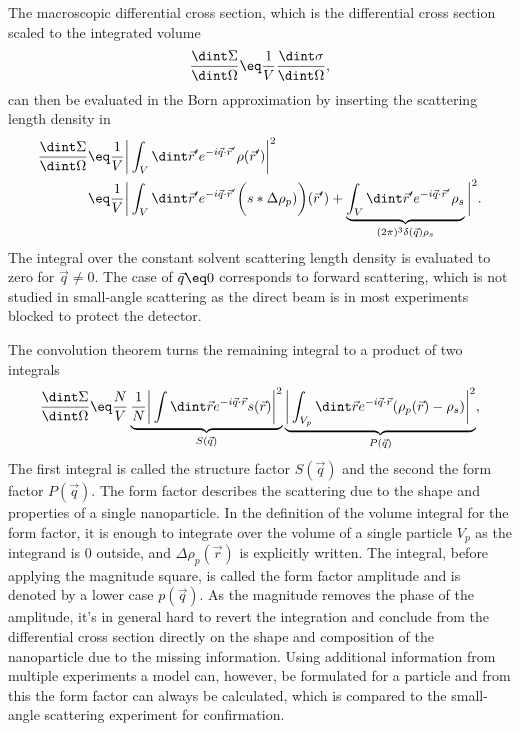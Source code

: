 \documentclass[\main/dresen_thesis.tex]{subfiles}
\begin{document}
    The macroscopic differential cross section, which is the differential cross section scaled to the integrated volume
    \begin{align}
      \frac{\dint \Sigma}{\dint \Omega} \eq \frac{1}{V} \frac{\dint \sigma}{\dint \Omega},
    \end{align}
    can then be evaluated in the Born approximation by inserting the scattering length density in 
    \begin{align}
      \begin{split}
        \frac{\dint \Sigma}{\dint \Omega}
        \eq& \frac{1}{V} \bigg| \int_V \dint \vec{r}^\prime e^{-i\vec{q} \cdot \vec{r}^\prime} \rho (\vec{r}^\prime) \bigg|^2 \\
        \eq& \frac{1}{V} \bigg| \int_{V} \dint \vec{r}^\prime e^{-i\vec{q} \cdot \vec{r}^\prime} \biggl( s * \Delta \rho_{p}) \biggr) (\vec{r}^\prime) + \underbrace{\int_{V} \dint \vec{r}^\prime e^{-i\vec{q} \cdot \vec{r}^\prime} \rho_s }_{(2 \pi)^3 \delta(\vec{q}) \rho_s} \bigg|^2.
      \end{split}
    \end{align}
    The integral over the constant solvent scattering length density is evaluated to zero for $\vec{q} \neq 0$.
    The case of $\vec{q} \eq 0$ corresponds to forward scattering, which is not studied in small-angle scattering as the direct beam is in most experiments blocked to protect the detector.

    The convolution theorem turns the remaining integral to a product of two integrals
    \begin{align}
      \frac{\dint \Sigma}{\dint \Omega}
      \eq \frac{N}{V} \underbrace{\frac{1}{N} \bigg|\int \dint \vec{r} e^{-i\vec{q} \cdot \vec{r}} s(\vec{r})\bigg|^2}_{S(\vec{q})}
      \underbrace{ \bigg|\int_{V_{p}} \dint \vec{r} e^{-i\vec{q} \cdot \vec{r}} (\rho_p (\vec{r}) - \rho_s) \bigg|^2}_{P(\vec{q})},\label{eq:theoreticalBackground:scattering:scatteringTheory:sasParticlesformStructureFactor}
    \end{align}
    The first integral is called the structure factor $S(\vec{q})$ and the second the form factor $P(\vec{q})$.
    The form factor describes the scattering due to the shape and properties of a single nanoparticle.
    In the definition of the volume integral for the form factor, it is enough to integrate over the volume of a single particle $V_p$ as the integrand is $0$ outside, and $\Delta \rho_p (\vec{r})$ is explicitly written.
    The integral, before applying the magnitude square, is called the form factor amplitude and is denoted by a lower case $p(\vec{q})$.
    As the magnitude removes the phase of the amplitude, it's in general hard to revert the integration and conclude from the differential cross section directly on the shape and composition of the nanoparticle due to the missing information.
    Using additional information from multiple experiments a model can, however, be formulated for a particle and from this the form factor can always be calculated, which is compared to the small-angle scattering experiment for confirmation.
\end{document}

